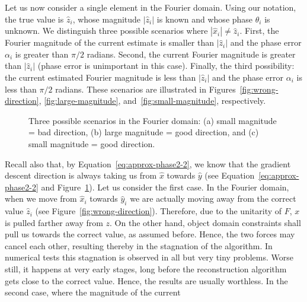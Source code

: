 Let us now consider a single element in the Fourier
domain. Using our notation, the true value is $\hat{z}_{i}$, whose
magnitude $|\hat{z}_{i}|$ is known and whose phase $\theta_{i}$ is
unknown. We distinguish three possible scenarios where $|\hat{x}_{i}|
\not= \hat{z}_{i}$. First, the
Fourier magnitude of the current estimate is smaller than
$|\hat{z}_{i}|$ and the phase
error $\alpha_{i}$ is greater than $\pi/2$ radians. Second, the current
Fourier magnitude is greater than $|\hat{z}_{i}|$ (phase error is
unimportant in this case). Finally, the third possibility: the
current estimated Fourier magnitude is less than $|\hat{z}_{i}|$ and
the phase 
error $\alpha_{i}$ is less than $\pi/2$ radians. These scenarios are
illustrated in Figures~\ref{fig:wrong-direction},
\ref{fig:large-magnitude}, and~\ref{fig:small-magnitude}, respectively.
\begin{figure}[H]
  \centering
  \quad{}
  \quad{}
  \caption[Three possible scenarios in the Fourier domain]{Three
    possible scenarios in the Fourier domain: (a) small magnitude =
    bad direction, (b) large magnitude = good direction, and (c) small
    magnitude = good direction.}
  \label{fig:possible-scenarios}
\end{figure}
Recall also that, by Equation~\eqref{eq:approx-phase2-2}, we know that the gradient
descent direction is always taking us from $\hat{x}$ towards $\hat{y}$
(see Equation~\eqref{eq:approx-phase2-2} and Figure~\ref{fig:possible-scenarios}).
Let us consider the first case. In the Fourier domain, when we move
from $\hat{x}_{i}$ towards $\hat{y}_{i}$ we are actually moving away
from the correct value $\hat{z}_{i}$ (see
Figure~\ref{fig:wrong-direction}).  Therefore, due to the unitarity of
$F$, $x$ is pulled farther away from $z$. On the other hand, object
domain constraints shall pull us towards the correct value, as assumed
before. Hence, the two forces may cancel each other, resulting thereby
in the stagnation of the algorithm. In numerical tests this stagnation
is observed in all but very tiny problems. Worse still, it
happens at very early stages, long before the reconstruction algorithm
gets close to the correct value. Hence, the results are usually
worthless.  In the second case, where the magnitude of the current
